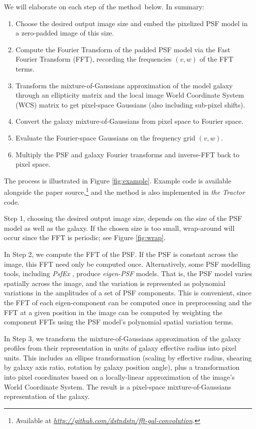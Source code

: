 \documentclass[11pt,preprint]{aastex}
\newcommand{\niceurl}[1]{\href{#1}{\textsl{#1}}}
\newcommand{\project}[1]{\textsl{#1}}
\newcommand{\trick}{method}
\begin{document}
We will elaborate on each step of the \trick\ below.  In summary:
\begin{enumerate}
\item Choose the desired output image size and embed the pixelized PSF
  model in a zero-padded image of this size.
\item Compute the Fourier Transform of the padded PSF model via the
  Fast Fourier Transform (FFT),
  recording the frequencies $(v, w)$ of the FFT terms.
\item Transform the mixture-of-Gaussians approximation of the model
  galaxy through an ellipticity matrix and the local image World
  Coordinate System (WCS) matrix to get pixel-space Gaussians
  (also including sub-pixel shifts).
\item Convert the galaxy mixture-of-Gaussians from pixel space to Fourier space.
\item Evaluate the Fourier-space Gaussians on the frequency grid $(v, w)$.
\item Multiply the PSF and galaxy Fourier transforms and inverse-FFT
  back to pixel space.
\end{enumerate}

The process is illustrated in Figure \ref{fig:example}.  Example code
is available alongside the paper source,\footnote{ Available at
  \niceurl{http://github.com/dstndstn/fft-gal-convolution}.}  and the
method is also implemented in \project{the Tractor} code.

Step 1, choosing the desired output image size, depends on the size of
the PSF model as well as the galaxy.  If the chosen size is too small,
wrap-around will occur since the FFT is periodic; see Figure \ref{fig:wrap}.

In Step 2, we compute the FFT of the PSF.  If the PSF is constant
across the image, this FFT need only be computed once.  Alternatively,
some PSF modelling tools, including \project{PsfEx} \citep{psfex},
produce \emph{eigen-PSF} models.  That is, the PSF model varies
spatially across the image, and the variation is represented as
polynomial variations in the amplitudes of a set of PSF components.
This is convenient, since the FFT of each eigen-component can be
computed once in preprocessing and the FFT at a given position in the
image can be computed by weighting the component FFTs using the PSF
model's polynomial spatial variation terms.

In Step 3, we transform the mixture-of-Gaussians approximation of the
galaxy profiles from their representation in units of galaxy effective
radius into pixel units.  This includes an ellipse transformation
(scaling by effective radius, shearing by galaxy axis ratio, rotation
by galaxy position angle), plus a transformation into pixel
coordinates based on a locally-linear approximation of the image's
World Coordinate System.
The result is a pixel-space mixture-of-Gaussians representation of the
galaxy.
\end{document}
